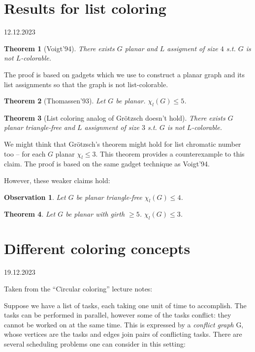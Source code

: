 \documentclass{article}
\newtheorem*{theorem}{Theorem}
\newtheorem*{observation}{Observation}
\begin{document}
\newpage
\section{Results for list coloring} %
12.12.2023

\begin{theorem}[Voigt'94]
	There exists $G$ planar and $L$ assigment of size $4$ s.t. $G$ is
	not $L$-colorable.
\end{theorem}

\noindent
The proof is based on gadgets which we use to construct a planar graph and its
list assignments so that the graph is not list-colorable.

\begin{theorem}[Thomassen'93]
	Let $G$ be planar. $\chi_l(G) \le 5$.
\end{theorem}

\begin{theorem}[List coloring analog of Grötzsch doesn't hold]
	There exists $G$ planar triangle-free and $L$ assignment of size $3$
	s.t. $G$ is not $L$-colorable.
\end{theorem}

\noindent
We might think that Grötzsch's theorem might hold for list chromatic number
too -- for each $G$ planar $\chi_l \le 3$. This theorem provides a
counterexample to this claim. The proof is based on the same gadget technique
as Voigt'94.

However, these weaker claims hold:

\begin{observation}
	Let $G$ be planar triangle-free $\chi_l(G) \le 4$.
\end{observation}

\begin{theorem}
	Let $G$ be planar with girth $\ge 5$. $\chi_l(G) \le 3$.
\end{theorem}


\newpage
\section{Different coloring concepts} %
19.12.2023

\noindent
Taken from the \enquote{Circular coloring} lecture notes:

\noindent
Suppose we have a list of tasks, each taking one unit of time to accomplish.
The tasks can be performed in parallel, however some of the tasks conflict:
they cannot be worked on at the same time. This is expressed by a
\emph{conflict graph} G, whose vertices are the tasks and edges join pairs of
conflicting tasks. There are several scheduling problems one can consider in
this setting:
\end{document}
